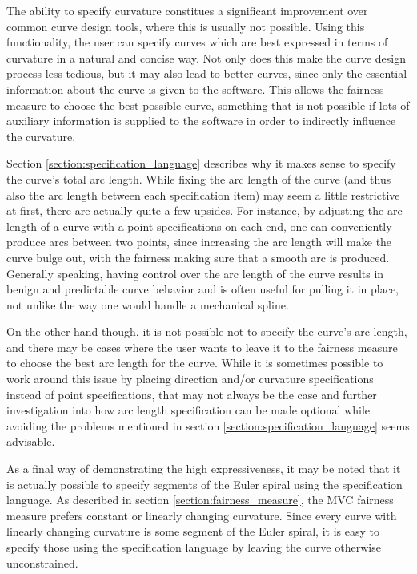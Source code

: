 \documentclass[a4paper]{article}
\begin{document}
				The ability to specify curvature constitues a significant improvement over common curve design tools, where this is usually not possible. Using this functionality, the user can specify curves which are best expressed in terms of curvature in a natural and concise way. Not only does this make the curve design process less tedious, but it may also lead to better curves, since only the essential information about the curve is given to the software. This allows the fairness measure to choose the best possible curve, something that is not possible if lots of auxiliary information is supplied to the software in order to indirectly influence the curvature.

				Section \ref{section:specification_language} describes why it makes sense to specify the curve's total arc length. While fixing the arc length of the curve (and thus also the arc length between each specification item) may seem a little restrictive at first, there are actually quite a few upsides. For instance, by adjusting the arc length of a curve with a point specifications on each end, one can conveniently produce arcs between two points, since increasing the arc length will make the curve bulge out, with the fairness making sure that a smooth arc is produced.
				Generally speaking, having control over the arc length of the curve results in benign and predictable curve behavior and is often useful for pulling it in place, not unlike the way one would handle a mechanical spline.

				On the other hand though, it is not possible not to specify the curve's arc length, and there may be cases where the user wants to leave it to the fairness measure to choose the best arc length for the curve. While it is sometimes possible to work around this issue by placing direction and/or curvature specifications instead of point specifications, that may not always be the case and further investigation into how arc length specification can be made optional while avoiding the problems mentioned in section \ref{section:specification_language} seems advisable.

				As a final way of demonstrating the high expressiveness, it may be noted that it is actually possible to specify segments of the Euler spiral using the specification language. As described in section \ref{section:fairness_measure}, the MVC fairness measure prefers constant or linearly changing curvature. Since every curve with linearly changing curvature is some segment of the Euler spiral, it is easy to specify those using the specification language by leaving the curve otherwise unconstrained.
\end{document}
